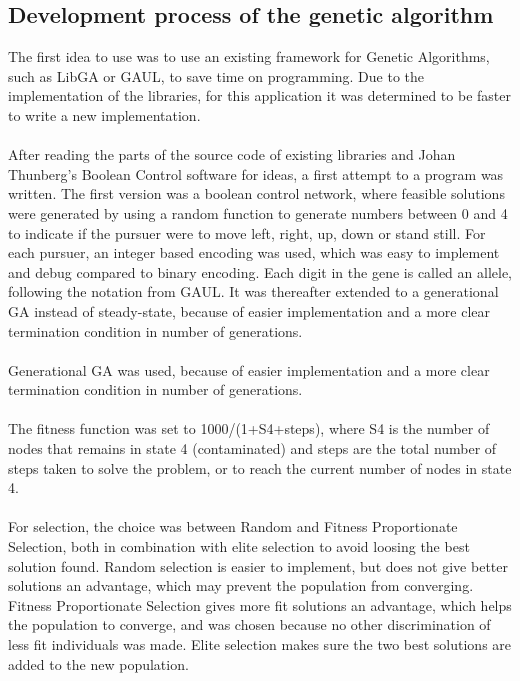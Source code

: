 \subsection{Development process of the genetic algorithm}
The first idea to use  was to use an existing framework for Genetic Algorithms, such as LibGA or GAUL, to save time on programming. Due to the implementation of the libraries, for this application it was determined to be faster to write a new implementation.\\
\\After reading the parts of the source code of existing libraries and Johan Thunberg's Boolean Control software for ideas, a first attempt to a program was written. The first version was a boolean control network, where feasible solutions were generated by using a random function to generate numbers between 0 and 4 to indicate if the pursuer were to move left, right, up, down or stand still. For each pursuer, an integer based encoding was used, which was easy to implement and debug compared to binary encoding. Each digit in the gene is called an allele, following the notation from GAUL. It was thereafter extended to a generational GA instead of steady-state, because of easier implementation and a more clear termination condition in number of generations. \\
\\Generational GA was used, because of easier implementation and a more clear termination condition in number of generations.\\
\\The fitness function was set to 1000/(1+S4+steps), where S4 is the number of nodes that remains in state 4 (contaminated) and steps are the total number of steps taken to solve the problem, or to reach the current number of nodes in state 4.\\
\\For selection, the choice was between Random and Fitness Proportionate Selection, both in combination with elite selection to avoid loosing the best solution found. Random selection is easier to implement, but does not give better solutions an advantage, which may prevent the population from converging. Fitness Proportionate Selection gives more fit solutions an advantage, which helps the population to converge, and was chosen because no other discrimination of less fit individuals was made. Elite selection makes sure the two best solutions are added to the new population.\\
